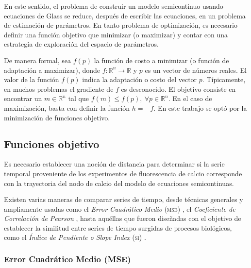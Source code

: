 En este sentido, el problema de construir un modelo semicontinuo usando ecuaciones de Glass se reduce, después de escribir las ecuaciones, en un problema de estimación de parámetros. En tanto problema de optimización, es necesario definir una función objetivo que minimizar (o maximizar) y contar con una estrategia de exploración del espacio de parámetros. 

De manera formal, sea $f(p)$ la función de costo a minimizar (o función de adaptación a maximizar), donde $f:\mathbb{R}^n\rightarrow \mathbb{R}$ y $p$ es un vector de números reales. El valor de la función $f(p)$ indica la adaptación o costo del vector $p$. Típicamente, en muchos problemas el gradiente de $f$ es desconocido. El objetivo consiste en encontrar un $m \in \mathbb{R}^n$ tal que $f(m) \le f(p),\ \forall p \in \mathbb{R}^n$. En el caso de maximización, basta con definir la función $h=-f$. En este trabajo se optó por la minimización de funciones objetivo.

\subsection{Funciones objetivo}

Es necesario establecer una noción de distancia para determinar si la serie temporal proveniente de los experimentos de fluorescencia de calcio corresponde con la trayectoria del nodo de calcio del modelo de ecuaciones semicontinuas.

Existen varias maneras de comparar series de tiempo, desde técnicas generales y ampliamente usadas como el \emph{Error Cuadrático Medio} \textsc{(mse)} \citep{msewiki}, el \emph{Coeficiente de Correlación de Pearson} \citep{pearsoncorrwiki}, hasta aquéllas que fueron diseñadas con el objetivo de establecer la similitud entre series de tiempo surgidas de procesos biológicos, como el \emph{Índice de Pendiente o Slope Index} \textsc{(si)} \citeauthor{Cho2006} \citep{Cho2006}.%

\subsubsection{Error Cuadrático Medio (MSE)}



